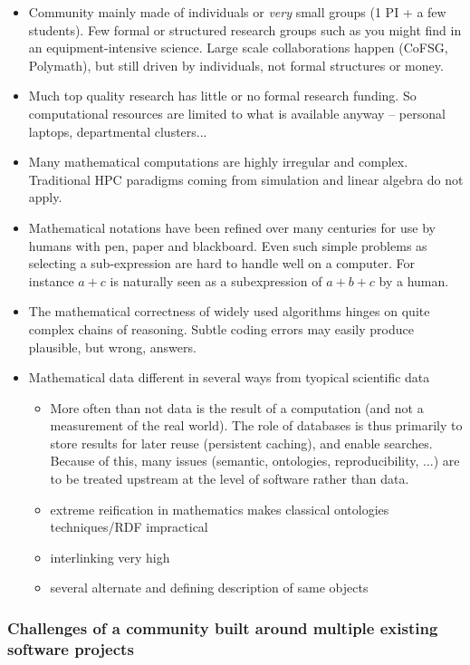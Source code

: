 \begin{itemize}
\item Community mainly made of individuals or \textit{very} small
  groups (1 PI + a few students). Few formal or structured research
  groups such as you might find in an equipment-intensive
  science. Large scale collaborations happen (CoFSG, Polymath),
  but still driven by individuals, not formal structures or money.
\item Much top quality research has little or no formal research
  funding. So computational resources are limited to what is available
  anyway -- personal laptops, departmental clusters...
\item Many mathematical computations are highly irregular and
  complex. Traditional HPC paradigms coming from simulation and linear
  algebra do not apply.
\item Mathematical notations have been refined over many centuries for
  use by humans with pen, paper and blackboard. Even such simple
  problems as selecting a sub-expression are hard to handle well on a
  computer. For instance $a+c$ is naturally seen as a subexpression of
  $a+b+c$ by a human.
\item The mathematical correctness of widely used algorithms hinges on
  quite complex chains of reasoning. Subtle coding errors may easily
  produce plausible, but wrong, answers.

\item Mathematical data different in several ways from tyopical
  scientific data
  \begin{itemize}
  \item More often than not data is the result of a computation (and
    not a measurement of the real world). The role of databases is thus primarily
    to store results for later reuse (persistent caching), and enable
    searches. Because of this, many issues (semantic, ontologies,
    reproducibility, ...) are to be treated upstream at the level of
    software rather than data.
  \item extreme reification in mathematics makes classical ontologies
    techniques/RDF impractical 
  \item interlinking very high
  \item several alternate and defining description of same objects
  \end{itemize}
\end{itemize}
\subsubsection{Challenges of a community built around multiple
  existing software projects}


